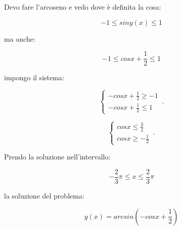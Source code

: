 \documentclass[../appunti-analisi.tex]{subfiles}
\begin{document}
Devo fare l'arcoseno e vedo dove è definita la cosa:

\[
    -1 \le sin y(x) \le 1
\]

ma anche:

\[
    -1 \le cosx + \frac{1}{2} \le 1
\]

impongo il sistema:

    \begin{equation}
        \begin{cases}
            -cosx +\frac{1}{2}\ge -1\\
            -cos x + \frac{1}{2} \le 1
        \end{cases}\,.
    \end{equation}

    \begin{equation}
        \begin{cases}
            cosx \le  \frac{3}{2}\\
            cosx \ge -\frac{1}{2}
        \end{cases}\,.
    \end{equation}


Prendo la soluzione nell'intervallo:

\[
    -\frac{2}{3}\pi \le  x \le  \frac{2}{3}\pi
\]

la soluzione del problema: 

\[
    y(x) = arcsin(-cosx +\frac{1}{2})
\]
\end{document}
